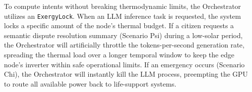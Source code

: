 To compute intents without breaking thermodynamic limits, the Orchestrator utilizes an \texttt{ExergyLock}. When an LLM inference task is requested, the system locks a specific amount of the node's thermal budget. If a citizen requests a semantic dispute resolution summary (Scenario Psi) during a low-solar period, the Orchestrator will artificially throttle the tokens-per-second generation rate, spreading the thermal load over a longer temporal window to keep the edge node's inverter within safe operational limits. If an emergency occurs (Scenario Chi), the Orchestrator will instantly kill the LLM process, preempting the GPU to route all available power back to life-support systems.
